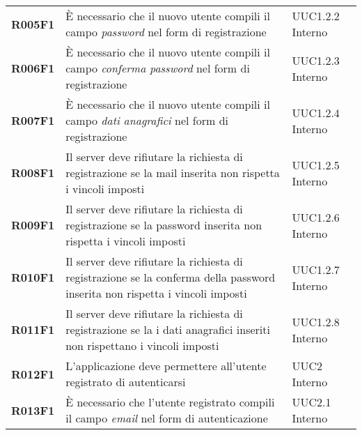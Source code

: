 \documentclass[../analisi-dei-requisiti.tex]{subfiles}
\begin{document}
\begin{longtable}[H]{>{\centering\bfseries}m{3cm} >{\centering}m{10cm} >{\centering\arraybackslash}m{3cm}}
  R005F1                               & È necessario che il nuovo utente compili il campo \textit{password} nel form di registrazione                                                                                                           & UUC1.2.2 Interno              \\
  R006F1                               & È necessario che il nuovo utente compili il campo \textit{conferma password} nel form di registrazione                                                                                                  & UUC1.2.3 Interno              \\
  R007F1                               & È necessario che il nuovo utente compili il campo \textit{dati anagrafici} nel form di registrazione                                                                                                    & UUC1.2.4 Interno              \\
  R008F1                               & Il server deve rifiutare la richiesta di registrazione se la mail inserita non rispetta i vincoli imposti                                                                                               & UUC1.2.5 Interno              \\
  R009F1                               & Il server deve rifiutare la richiesta di registrazione se la password inserita non rispetta i vincoli imposti                                                                                           & UUC1.2.6 Interno              \\
  R010F1                               & Il server deve rifiutare la richiesta di registrazione se la conferma della password inserita non rispetta i vincoli imposti                                                                            & UUC1.2.7 Interno              \\
  R011F1                               & Il server deve rifiutare la richiesta di registrazione se la i dati anagrafici inseriti non rispettano i vincoli imposti                                                                                & UUC1.2.8 Interno              \\
  R012F1                               & L'applicazione deve permettere all'utente registrato di autenticarsi                                                                                                                                    & UUC2 Interno                  \\
  R013F1                               & È necessario che l'utente registrato compili il campo \textit{email} nel form di autenticazione                                                                                                         & UUC2.1 Interno                \\

\end{longtable}
\end{document}
